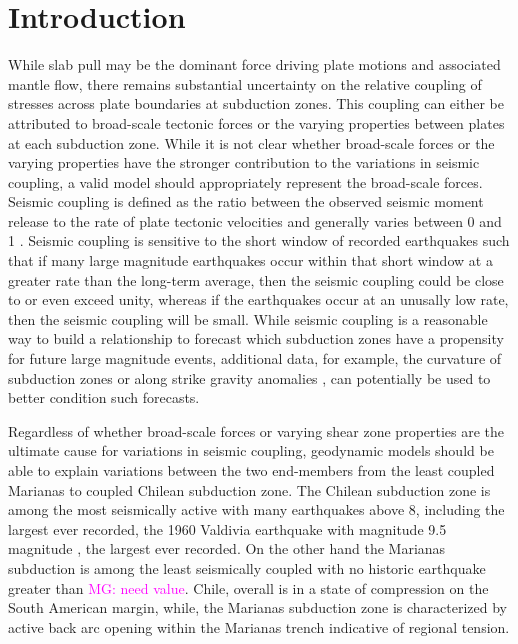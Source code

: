 \documentclass[12pt]{article}
\newcommand{\mgnote}[1]{\textcolor{magenta}{MG: #1}}
\begin{document}
\section{Introduction}
While slab pull may be the dominant force driving plate motions and associated mantle flow, there remains substantial uncertainty on the relative coupling of stresses across plate boundaries at subduction zones. This coupling can either be attributed to broad-scale tectonic forces or the varying properties between plates at each subduction zone. While it is not clear whether broad-scale forces or the varying properties have the stronger contribution to the variations in seismic coupling, a valid model should appropriately represent the broad-scale forces. 
Seismic coupling is defined as the ratio between the observed seismic moment release to the rate of plate tectonic velocities and generally varies between 0 and 1 \citep{davies1971regional}. 
Seismic coupling is sensitive to the short window of recorded earthquakes such that if many large magnitude earthquakes occur within that short window 
at a greater rate than the long-term average, then the seismic coupling could be close to or even exceed unity, whereas if the earthquakes occur at an unusally low rate, then the seismic coupling will be small.  While seismic coupling is a reasonable way to build a relationship to forecast which subduction zones have a propensity for future large magnitude events, additional data, for example, the curvature of subduction zones \citep{bletery2016mega} or along strike gravity anomalies \citep{song2003large}, 
can potentially be used to better condition such forecasts. 


Regardless of whether broad-scale forces or varying shear zone properties are the ultimate cause for variations in seismic coupling, geodynamic models should be able to explain variations between the two end-members from the least coupled Marianas to coupled Chilean subduction zone. The Chilean subduction zone is among the most seismically active with many earthquakes above 8, including the largest ever recorded, the 1960 Valdivia earthquake with magnitude 9.5 magnitude \citep{kanamori1974},
the largest ever recorded. On the other hand the Marianas subduction is among the least seismically coupled with no historic earthquake greater than \mgnote{ need value}. 
Chile, overall is in a state of compression on the South American margin, while, the Marianas subduction zone is characterized by active back arc opening within the Marianas trench indicative of regional tension.
\end{document}

